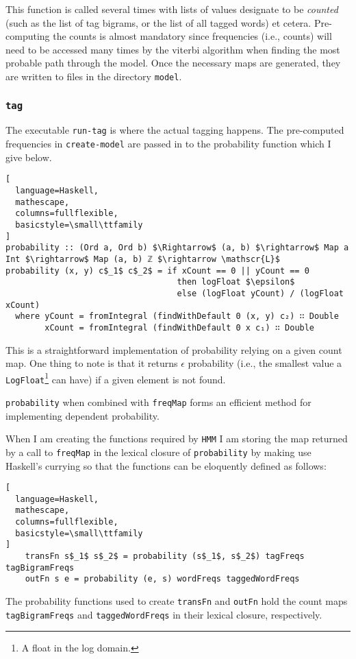 \documentclass{article}
\begin{document}
This function is called several times with lists of values designate to be
\emph{counted} (such as the list of tag bigrams, or the list of all tagged words)
et cetera. Pre-computing the counts is almost mandatory since frequencies (i.e.,
counts) will need to be accessed many times by the viterbi algorithm when
finding the most probable path through the model. Once the necessary maps are
generated, they are written to files in the directory \texttt{model}.

\subsubsection{\texttt{tag}}
\label{par:tag}

The executable \texttt{run-tag} is where the actual tagging happens. The
pre-computed frequencies  in \texttt{create-model} are passed in to the
probability function which I give below.
\begin{lstlisting}[
  language=Haskell,
  mathescape,
  columns=fullflexible,
  basicstyle=\small\ttfamily
]
probability :: (Ord a, Ord b) $\Rightarrow$ (a, b) $\rightarrow$ Map a Int $\rightarrow$ Map (a, b) ℤ $\rightarrow \mathscr{L}$
probability (x, y) c$_1$ c$_2$ = if xCount == 0 || yCount == 0
                                   then logFloat $\epsilon$
                                   else (logFloat yCount) / (logFloat xCount)
  where yCount = fromIntegral (findWithDefault 0 (x, y) c₂) ∷ Double
        xCount = fromIntegral (findWithDefault 0 x c₁) ∷ Double
\end{lstlisting}
This is a straightforward implementation of probability relying on a given count
map. One thing to note is that it returns $\epsilon$ probability (i.e., the
smallest value a \texttt{LogFloat}\footnote{A float in the log domain.} can have) if a given element is not found.

\texttt{probability} when combined with \texttt{freqMap} forms an efficient
method for implementing dependent probability.

When I am creating the functions required by \texttt{HMM} I am storing the
map returned by a call to \texttt{freqMap} in the lexical closure of
\texttt{probability} by making use Haskell's currying so that the functions can
be eloquently defined as follows:
\begin{lstlisting}[
  language=Haskell,
  mathescape,
  columns=fullflexible,
  basicstyle=\small\ttfamily
]
    transFn s$_1$ s$_2$ = probability (s$_1$, s$_2$) tagFreqs tagBigramFreqs
    outFn s e = probability (e, s) wordFreqs taggedWordFreqs
\end{lstlisting}
The probability functions used to create \texttt{transFn} and \texttt{outFn}
hold the count maps \texttt{tagBigramFreqs} and \texttt{taggedWordFreqs} in
their lexical closure, respectively.
\end{document}
